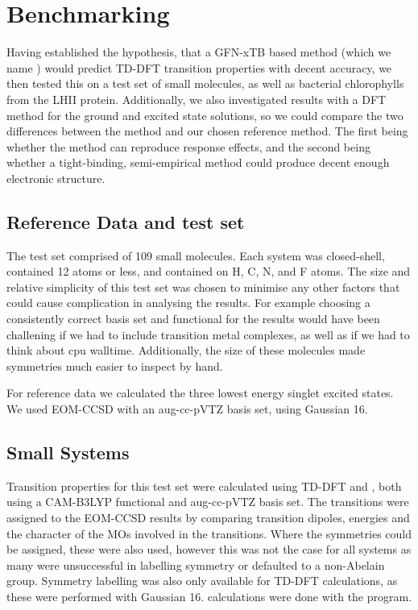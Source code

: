 \section{Benchmarking}
\label{sec:benchmarking}
Having established the hypothesis, that a GFN-xTB based \dscf method (which we
name \dxtb) would predict TD-DFT transition properties with decent accuracy, we
then tested this on a test set of small molecules, as well as bacterial chlorophylls
from the LHII protein. Additionally, we also investigated \dscf results with a DFT method
for the ground and excited state solutions, so we could compare the two differences
between the \dxtb method and our chosen reference method. The first being whether
the \dscf method can reproduce response effects, and the second being whether a
tight-binding, semi-empirical method could produce decent enough electronic
structure.

\subsection{Reference Data and test set}
\label{subsec:reference_data}
The test set comprised of 109 small molecules. Each system was closed-shell, 
contained 12 atoms or less, and contained on H, C, N, and F atoms. The size and
relative simplicity of this test set was chosen to minimise any other factors that
could cause complication in analysing the results. For example choosing a consistently
correct basis set and functional for the \dscf results would have been challening 
if we had to include transition metal complexes, as well as if we had to think 
about cpu walltime. Additionally, the size of these molecules made symmetries
much easier to inspect by hand.

For reference data we calculated the three lowest energy singlet excited states. We used
EOM-CCSD with an aug-cc-pVTZ basis set, using Gaussian 16. 

\subsection{Small Systems}
\label{subsec:smalltest}
Transition properties for this test set were calculated using TD-DFT and \dscf,
both using a CAM-B3LYP functional and aug-cc-pVTZ basis set. The transitions were
assigned to the EOM-CCSD results by comparing transition dipoles, energies and 
the character of the MOs involved in the transitions. Where the symmetries could
be assigned, these were also used, however this was not the case for all systems
as many were unsuccessful in labelling symmetry or defaulted to a non-Abelain group.
Symmetry labelling was also only available for TD-DFT calculations, as these were
performed with Gaussian 16. \dscf calculations were done with the 
program.

